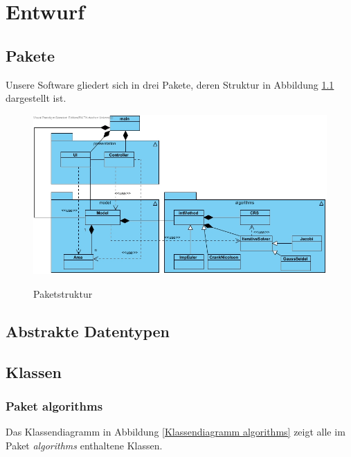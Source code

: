 \chapter{Entwurf}
\section{Pakete}
Unsere Software gliedert sich in drei Pakete, deren Struktur in Abbildung \ref{Paketdiagramm} dargestellt ist.

\begin{figure}[H]
	\centering
	\includegraphics[scale=.65]{Bilder/Paketdiagramm.jpg}\\
	\caption{Paketstruktur}
	\label{Paketdiagramm}
\end{figure}

\section{Abstrakte Datentypen}

\section{Klassen}

\subsection{Paket algorithms}

Das Klassendiagramm in Abbildung \ref{Klassendiagramm algorithms} zeigt alle im Paket \emph{algorithms} enthaltene Klassen.


